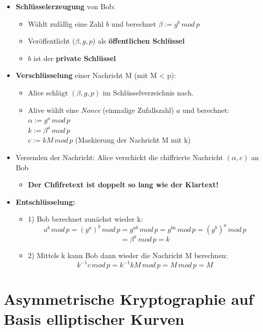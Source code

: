 \documentclass[openany]{book}
\begin{document}
\begin{itemize}
    \item \textbf{Schlüsselerzeugung} von Bob:
    \begin{itemize}
        \item Wählt zufällig eine Zahl $b$ und berechnet $\beta := g^b \, mod \, p$
        \item Veröffentlicht ($\beta ,g,p$) als \textbf{öffentlichen Schlüssel}
        \item $b$ ist der \textbf{private Schlüssel}
    \end{itemize}
    \item \textbf{Verschlüsselung} einer Nachricht M (mit M < p):
    \begin{itemize}
        \item Alice schlägt $(\beta ,g,p)$ im Schlüsselverzeichnis nach.
        \item Alive wählt eine \textit{Nonce} (einmalige Zufallszahl) $a$ und berechnet: \\ $\alpha := g^a \, mod \, p$ \\ $k:=\beta ^a \, mod \, p$ \\ $c:=kM \, mod \, p$ (Maskierung der Nachricht M mit k)
    \end{itemize}
    \item Versenden der Nachricht: Alice verschickt die chiffrierte Nachricht $(\alpha , c)$ an Bob
    \begin{itemize}
        \item \textbf{Der Chfifretext ist doppelt so lang wie der Klartext!}
    \end{itemize}
    \item \textbf{Entschlüsselung:}
    \begin{itemize}
        \item 1) Bob berechnet zunächst wieder k:  $$a^b \, mod \, p = (g^a)^b \, mod \, p = g^{ab}\, mod\, p = g^{ba}\, mod\, p = (g^b)^a\, mod \, p$$ $$=\beta ^a \, mod\, p = k$$
        \item 2) Mittels k kann Bob dann wieder die Nachricht M berechnen: $$k^{-1}c\, mod\, p= k^{-1}kM\, mod\, p = M\, mod \, p  = M$$
    \end{itemize}
\end{itemize}

\section{Asymmetrische Kryptographie auf Basis elliptischer Kurven}
\end{document}
